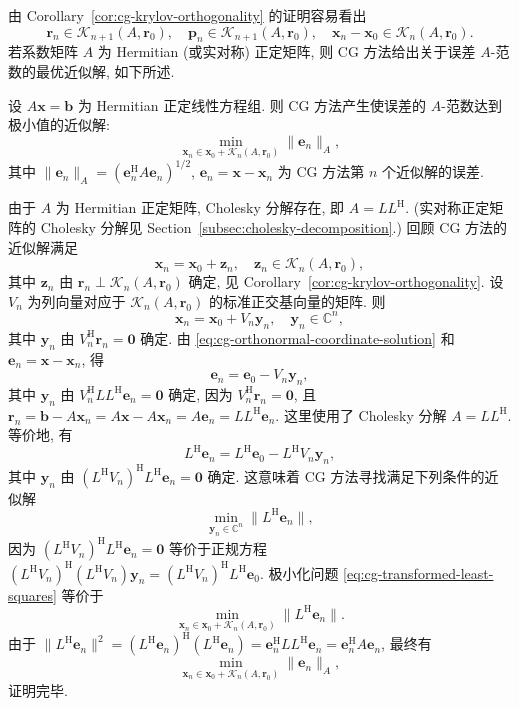 {由 Corollary\ \ref{cor:cg-krylov-orthogonality} 的证明容易看出}
\begin{equation}\label{eq:cg-krylov-membership}
\bm r_n\in\mathcal K_{n+1}(A,\bm r_0),\quad\bm p_n\in\mathcal K_{n+1}(A,\bm r_0),\quad\bm x_n-\bm x_0\in\mathcal K_n(A,\bm r_0).
\end{equation}
{若系数矩阵 $A$ 为 Hermitian (或实对称) 正定矩阵, 则 CG 方法给出关于误差 $A$-范数的最优近似解, 如下所述.}
\begin{Theorem}\label{thm:cg-energy-optimality}
{设 $A\bm x=\bm b$ 为 Hermitian 正定线性方程组. 则 CG 方法产生使误差的 $A$-范数达到极小值的近似解:}
\[\min_{\bm x_n\in\bm x_0+\mathcal K_n(A,\bm r_0)}\|\bm e_n\|_A,\]
{其中 $\|\bm e_n\|_A=(\bm e_n^{\mathrm H}A\bm e_n)^{1/2}$, $\bm e_n=\bm x-\bm x_n$ 为 CG 方法第 $n$ 个近似解的误差.}
\end{Theorem}
\begin{Proof}
{由于 $A$ 为 Hermitian 正定矩阵, Cholesky 分解存在, 即 $A=LL^{\mathrm H}$. (实对称正定矩阵的 Cholesky 分解见 Section\ \ref{subsec:cholesky-decomposition}.) 回顾 CG 方法的近似解满足}
\[\bm x_n=\bm x_0+\bm z_n,\quad\bm z_n\in\mathcal K_n(A,\bm r_0),\]
{其中 $\bm z_n$ 由 $\bm r_n\perp\mathcal K_n(A,\bm r_0)$ 确定, 见 Corollary\ \ref{cor:cg-krylov-orthogonality}. 设 $V_n$ 为列向量对应于 $\mathcal K_n(A,\bm r_0)$ 的标准正交基向量的矩阵. 则}
\begin{equation}\label{eq:cg-orthonormal-coordinate-solution}\bm x_n=\bm x_0+V_n\bm y_n,\quad\bm y_n\in\mathbb C^n,\end{equation}
{其中 $\bm y_n$ 由 $V_n^{\mathrm H}\bm r_n=\bm0$ 确定. 由 \eqref{eq:cg-orthonormal-coordinate-solution} 和 $\bm e_n=\bm x-\bm x_n$, 得}
\[\bm e_n=\bm e_0-V_n\bm y_n,\]
{其中 $\bm y_n$ 由 $V_n^{\mathrm H}LL^{\mathrm H}\bm e_n=\bm0$ 确定, 因为 $V_n^{\mathrm H}\bm r_n=\bm0$, 且 $\bm r_n=\bm b-A\bm x_n=A\bm x-A\bm x_n=A\bm e_n=LL^{\mathrm H}\bm e_n$. 这里使用了 Cholesky 分解 $A=LL^{\mathrm H}$. 等价地, 有}
\[L^{\mathrm H}\bm e_n=L^{\mathrm H}\bm e_0-L^{\mathrm H}V_n\bm y_n,\]
{其中 $\bm y_n$ 由 $(L^{\mathrm H}V_n)^{\mathrm H}L^{\mathrm H}\bm e_n=\bm0$ 确定. 这意味着 CG 方法寻找满足下列条件的近似解}
\begin{equation}\label{eq:cg-transformed-least-squares}\min_{\bm y_n\in\mathbb C^n}\|L^{\mathrm H}\bm e_n\|,\end{equation}
{因为 $(L^{\mathrm H}V_n)^{\mathrm H}L^{\mathrm H}\bm e_n=\bm0$ 等价于正规方程 $(L^{\mathrm H}V_n)^{\mathrm H}(L^{\mathrm H}V_n)\bm y_n=(L^{\mathrm H}V_n)^{\mathrm H}L^{\mathrm H}\bm e_0$. 极小化问题 \eqref{eq:cg-transformed-least-squares} 等价于}
\[\min_{\bm x_n\in\bm x_0+\mathcal K_n(A,\bm r_0)}\|L^{\mathrm H}\bm e_n\|.\]
{由于 $\|L^{\mathrm H}\bm e_n\|^2=(L^{\mathrm H}\bm e_n)^{\mathrm H}(L^{\mathrm H}\bm e_n)=\bm e_n^{\mathrm H}LL^{\mathrm H}\bm e_n=\bm e_n^{\mathrm H}A\bm e_n$, 最终有}
\[\min_{\bm x_n\in\bm x_0+\mathcal K_n(A,\bm r_0)}\|\bm e_n\|_A,\]
{证明完毕.}\end{Proof}
